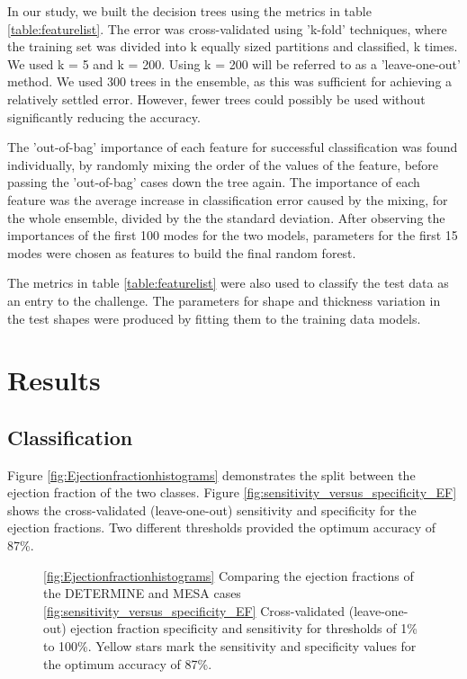 \documentclass{llncs}
\begin{document}
 In our study, we built the decision trees using the metrics in table \ref{table:featurelist}. The error was cross-validated using 'k-fold' techniques, where the training set was divided into k equally sized partitions and classified, k times. We used k = 5 and k = 200. Using k = 200 will be referred to as a 'leave-one-out' method. We used 300 trees in the ensemble, as this was sufficient for achieving a relatively settled error. However, fewer trees could possibly be used without significantly reducing the accuracy.

The 'out-of-bag' importance of each feature for successful classification was found individually, by randomly mixing the order of the values of the feature, before passing the 'out-of-bag' cases down the tree again. The importance of each feature was the average increase in classification error caused by the mixing, for the whole ensemble, divided by the the standard deviation.
After observing the importances of the first 100 modes for the two models, parameters for the first 15 modes were chosen as features to build the final random forest.

 The metrics in table \ref{table:featurelist} were also used to classify the test data as an entry to the challenge. The parameters for shape and thickness variation in the test shapes were produced by fitting them to the training data models.

\section{Results}
	\subsection{Classification}
		Figure \ref{fig:Ejectionfractionhistograms} demonstrates the split between the ejection fraction of the two classes. Figure \ref{fig:sensitivity_versus_specificity_EF} shows the cross-validated (leave-one-out) sensitivity and specificity for the ejection fractions. Two different thresholds provided the optimum accuracy of 87\%.
		\begin{figure}[]
		
\begin{center} 
\qquad
{}
\caption{ \ref{fig:Ejectionfractionhistograms} Comparing the ejection fractions of the DETERMINE and MESA cases \ref{fig:sensitivity_versus_specificity_EF} Cross-validated (leave-one-out) ejection fraction specificity and sensitivity for thresholds of 1\% to 100\%. Yellow stars mark the sensitivity and specificity values for the optimum accuracy of 87\%.}
\label{fig:EFs}
\end{center}    
		\end{figure}
  
\end{document}
